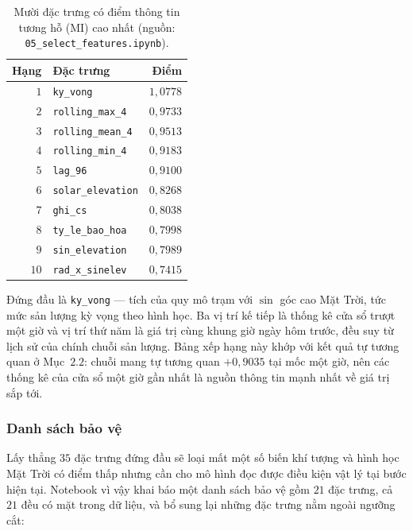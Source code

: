 \begin{table}[htbp]
\centering
\caption{Mười đặc trưng có điểm thông tin tương hỗ (MI) cao nhất (nguồn: \texttt{05\_select\_features.ipynb}).}
\label{tab:mi}
\small
\begin{tabular}{r l r}
\toprule
\textbf{Hạng} & \textbf{Đặc trưng} & \textbf{Điểm} \\
\midrule
$1$  & \texttt{ky\_vong}         & $1{,}0778$ \\
$2$  & \texttt{rolling\_max\_4}   & $0{,}9733$ \\
$3$  & \texttt{rolling\_mean\_4}  & $0{,}9513$ \\
$4$  & \texttt{rolling\_min\_4}   & $0{,}9183$ \\
$5$  & \texttt{lag\_96}          & $0{,}9100$ \\
$6$  & \texttt{solar\_elevation} & $0{,}8268$ \\
$7$  & \texttt{ghi\_cs}          & $0{,}8038$ \\
$8$  & \texttt{ty\_le\_bao\_hoa}   & $0{,}7998$ \\
$9$  & \texttt{sin\_elevation}   & $0{,}7989$ \\
$10$ & \texttt{rad\_x\_sinelev}   & $0{,}7415$ \\
\bottomrule
\end{tabular}
\end{table}

Đứng đầu là \texttt{ky\_vong} --- tích của quy mô trạm với $\sin$ góc cao Mặt Trời, tức mức
sản lượng kỳ vọng theo hình học. Ba vị trí kế tiếp là thống kê cửa sổ trượt một giờ và vị trí
thứ năm là giá trị cùng khung giờ ngày hôm trước, đều suy từ lịch sử của chính chuỗi sản lượng. Bảng xếp hạng này khớp với kết quả tự tương quan ở Mục~$2.2$: chuỗi mang
tự tương quan $+0{,}9035$ tại mốc một giờ, nên các thống kê của cửa sổ một giờ gần nhất là nguồn
thông tin mạnh nhất về giá trị sắp tới.

\subsubsection{Danh sách bảo vệ}

Lấy thẳng $35$ đặc trưng đứng đầu sẽ loại mất một số biến khí tượng và hình học Mặt Trời có điểm
thấp nhưng cần cho mô hình đọc được điều kiện vật lý tại bước hiện tại. Notebook vì vậy khai báo
một danh sách bảo vệ gồm $21$ đặc trưng, cả $21$ đều có mặt trong dữ liệu, và bổ sung lại những
đặc trưng nằm ngoài ngưỡng cắt:

